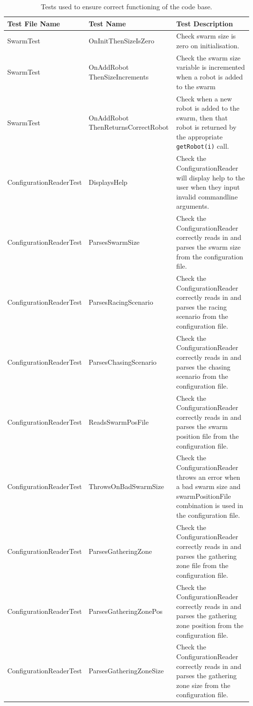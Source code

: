 \documentclass[11pt,a4paper]{article}
\begin{document}
\begin{table}[h!]
    \centering
    \caption{Tests used to ensure correct functioning of the code base.}
    \begin{tabular}[t]{|p{4cm}|p{4cm}|p{5cm}|} \hline
        \textbf{Test File Name} & \textbf{Test Name} & \textbf{Test Description} \\
        \hline  SwarmTest & OnInitThenSizeIsZero & Check swarm size is zero on
        initialisation. \\
        \hline  SwarmTest & OnAddRobot ThenSizeIncrements & Check the swarm size
        variable is incremented when a robot is added to the swarm\\
        \hline  SwarmTest & OnAddRobot ThenReturnsCorrectRobot & Check when a
        new robot is added to the swarm, then that robot is returned by the
        appropriate \texttt{getRobot(i)} call.\\
        \hline  ConfigurationReaderTest & DisplaysHelp & Check the
        ConfigurationReader will display help to the user when they input
        invalid commandline arguments.\\
        \hline  ConfigurationReaderTest & ParsesSwarmSize & Check the
        ConfigurationReader correctly reads in and parses the swarm size from
        the configuration file.\\
        \hline  ConfigurationReaderTest & ParsesRacingScenario & Check the
        ConfigurationReader correctly reads in and parses the racing scenario from
        the configuration file.\\
        \hline  ConfigurationReaderTest & ParsesChasingScenario & Check the
        ConfigurationReader correctly reads in and parses the chasing scenario from
        the configuration file. \\
        \hline  ConfigurationReaderTest & ReadsSwarmPosFile & Check the
        ConfigurationReader correctly reads in and parses the swarm position
        file from the configuration file. \\
        \hline  ConfigurationReaderTest & ThrowsOnBadSwarmSize & Check the
        ConfigurationReader throws an error when a bad swarm size and
        swarmPositionFile combination is used in the configuration file. \\
        \hline  ConfigurationReaderTest & ParsesGatheringZone & Check the
        ConfigurationReader correctly reads in and parses the gathering zone
        file from the configuration file. \\
        \hline  ConfigurationReaderTest & ParsesGatheringZonePos & Check the
        ConfigurationReader correctly reads in and parses the gathering zone
        position from the configuration file. \\
        \hline  ConfigurationReaderTest & ParsesGatheringZoneSize & Check the
        ConfigurationReader correctly reads in and parses the gathering zone
        size from the configuration file. \\
        \hline
    \end{tabular}
    \label{tab:tests}
\end{table}
\end{document}
